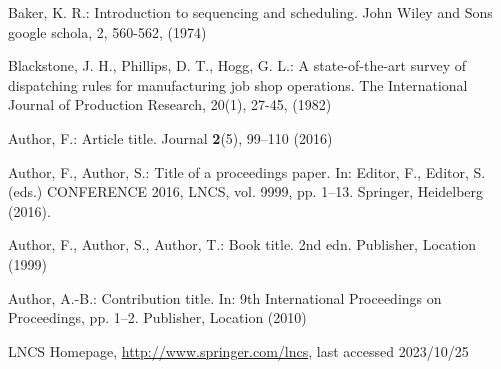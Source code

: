 \begin{thebibliography}{8}
	Baker, K. R.: Introduction to sequencing and scheduling. John Wiley and Sons google schola, 2, 560-562, (1974)
	
	Blackstone, J. H., Phillips, D. T., Hogg, G. L.: A state-of-the-art survey of dispatching rules for manufacturing job shop operations. The International Journal of Production Research, 20(1), 27-45, (1982)
	
	
	
	Author, F.: Article title. Journal \textbf{2}(5), 99--110 (2016)
	
	Author, F., Author, S.: Title of a proceedings paper. In: Editor,
	F., Editor, S. (eds.) CONFERENCE 2016, LNCS, vol. 9999, pp. 1--13.
	Springer, Heidelberg (2016). 
	
	Author, F., Author, S., Author, T.: Book title. 2nd edn. Publisher,
	Location (1999)
	
	Author, A.-B.: Contribution title. In: 9th International Proceedings
	on Proceedings, pp. 1--2. Publisher, Location (2010)
	
	LNCS Homepage, \url{http://www.springer.com/lncs}, last accessed 2023/10/25
\end{thebibliography}